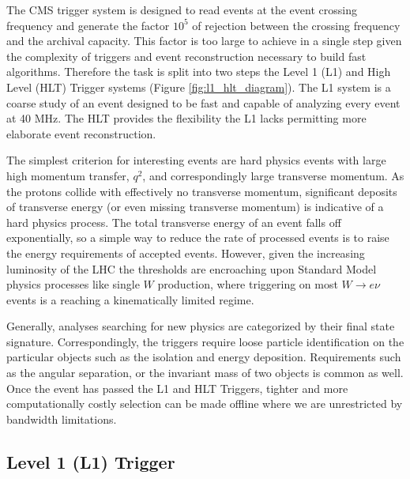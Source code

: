 The CMS trigger system is designed to read events at the event crossing frequency and generate the
 factor $10^5$ of rejection between the crossing frequency and the archival capacity. This factor 
is too large to achieve in a single step given the complexity of triggers and event reconstruction necessary
to build fast algorithms. Therefore the task is split into two steps the Level 1 (L1) and High Level
 (HLT) Trigger systems (Figure \ref{fig:l1_hlt_diagram}). The L1 system is a coarse study of an event designed
to be fast and capable of analyzing every event at 40 MHz. The HLT provides the flexibility the L1 lacks 
permitting more elaborate event reconstruction. 


The simplest criterion for interesting events are hard physics events with large high momentum transfer, $q^2$, and
correspondingly large transverse momentum.
 As the protons collide with effectively no transverse momentum, significant deposits of 
transverse energy (or even missing transverse momentum) is indicative of a hard physics process. 
The total transverse energy of an event falls off exponentially, so a simple way to
reduce the rate of processed events is to raise the energy requirements of accepted events. However,
given the increasing luminosity of the LHC the thresholds are encroaching upon Standard Model physics processes
like single $W$ production, where triggering on most $W\rightarrow e\nu$ events is a reaching a kinematically limited regime. 

Generally, analyses searching for new physics are categorized by their final state signature.
Correspondingly, the triggers require loose particle identification 
on the particular objects such as the isolation and energy deposition. 
Requirements such as the angular separation, or the invariant mass of two objects is common as well.
Once the event has passed the  L1 and HLT Triggers, tighter and more computationally 
costly selection can be made offline where we are unrestricted by bandwidth limitations. 

\subsection{Level 1 (L1) Trigger}

